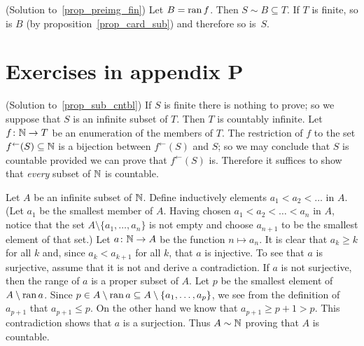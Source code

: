 \begin{prf}\label{sol_prop_preimg_fin}(Solution to~\ref{prop_preimg_fin})
Let $B = \operatorname{ran} f$. Then $S \sim B \subseteq T$. If $T$ is finite, so is $B$ (by
proposition~\ref{prop_card_sub}) and therefore so is~$S$.
\end{prf}




















\section{Exercises in appendix P}

\begin{prf}\label{sol_prop_sub_cntbl}(Solution to~\ref{prop_sub_cntbl})
If $S$ is finite there is nothing to prove; so we suppose that $S$ is an infinite subset of
$T$.  Then $T$ is countably infinite.  Let $f \colon \mathbb{N} \rightarrow T$ be an enumeration of the
members of $T$. The restriction of $f$ to the set $f^\gets(S) \subseteq \mathbb{N}$ is a bijection
between $f^\gets(S)$ and $S$; so we may conclude that $S$ is countable provided we can prove
that $f^\gets(S)$ is. Therefore it suffices to show that \emph{every} subset of $\mathbb{N}$  is
countable.

Let $A$ be an infinite subset of $\mathbb{N}$. Define inductively elements $a_1 < a_2 < \dots$ in $A$.
(Let $a_1$ be the smallest member of $A$. Having chosen $a_1 < a_2 < \dots < a_n$ in $A$,
notice that the set $A \setminus \{a_1,\dots,a_n\}$ is not empty and choose $a_{n+1}$ to be
the smallest element of that set.)  Let $a \colon \mathbb{N} \rightarrow A$ be the function $n \mapsto a_n$.
It is clear that $a_k \ge k$ for all $k$ and, since $a_k < a_{k+1}$ for all $k$, that $a$ is
injective.  To see that $a$ is surjective, assume that it is not and derive a contradiction.
If $a$ is not surjective, then the range of $a$ is a proper subset of $A$.  Let $p$ be the
smallest element of $A \setminus \operatorname{ran} a$.  Since $p \in A \setminus \operatorname{ran} a \subseteq A
\setminus \{a_1,\dots,a_p\}$, we see from the definition of $a_{p+1}$ that $a_{p+1} \le p$. On
the other hand we know that $ a_{p+1} \ge p + 1 > p$.  This contradiction shows that $a$ is a
surjection.  Thus $A \sim \mathbb{N}$ proving that $A$ is countable.
\end{prf}

